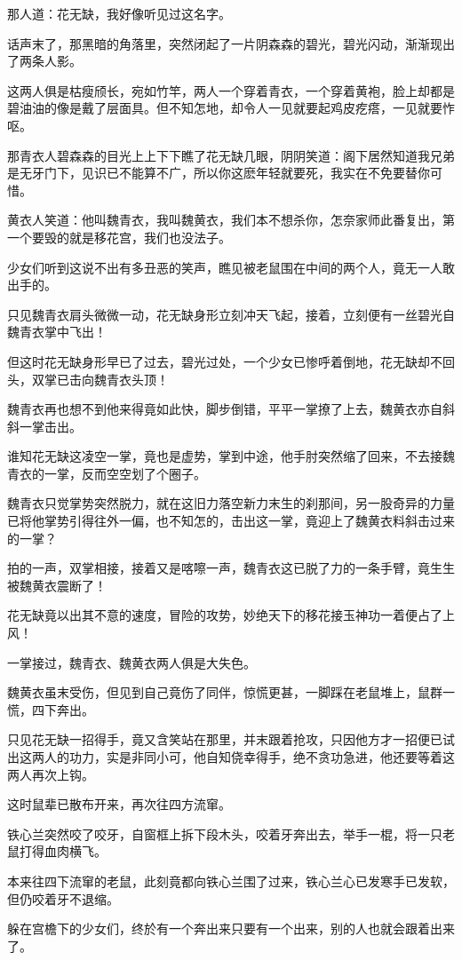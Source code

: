 \documentclass[12pt,oneside]{book}
\begin{document}
那人道：花无缺，我好像听见过这名字。

话声末了，那黑暗的角落里，突然闭起了一片阴森森的碧光，碧光闪动，渐渐现出了两条人影。

这两人俱是枯瘦颀长，宛如竹竿，两人一个穿着青衣，一个穿着黄袍，脸上却都是碧油油的像是戴了层面具。但不知怎地，却令人一见就要起鸡皮疙瘩，一见就要怍呕。

那青衣人碧森森的目光上上下下瞧了花无缺几眼，阴阴笑道：阁下居然知道我兄弟是无牙门下，见识已不能算不广，所以你这麽年轻就要死，我实在不免要替你可惜。

黄衣人笑道：他叫魏青衣，我叫魏黄衣，我们本不想杀你，怎奈家师此番复出，第一个要毁的就是移花宫，我们也没法子。

少女们听到这说不出有多丑恶的笑声，瞧见被老鼠围在中间的两个人，竟无一人敢出手的。

只见魏青衣肩头微微一动，花无缺身形立刻冲天飞起，接着，立刻便有一丝碧光自魏青衣掌中飞出！

但这时花无缺身形早已了过去，碧光过处，一个少女已惨呼着倒地，花无缺却不回头，双掌已击向魏青衣头顶！

魏青衣再也想不到他来得竟如此快，脚步倒错，平平一掌撩了上去，魏黄衣亦自斜斜一掌击出。

谁知花无缺这凌空一掌，竟也是虚势，掌到中途，他手肘突然缩了回来，不去接魏青衣的一掌，反而空空划了个圈子。

魏青衣只觉掌势突然脱力，就在这旧力落空新力末生的刹那间，另一股奇异的力量已将他掌势引得往外一偏，也不知怎的，击出这一掌，竟迎上了魏黄衣料斜击过来的一掌？

拍的一声，双掌相接，接着又是喀嚓一声，魏青衣这已脱了力的一条手臂，竟生生被魏黄衣震断了！

花无缺竟以出其不意的速度，冒险的攻势，妙绝天下的移花接玉神功一着便占了上风！

一掌接过，魏青衣、魏黄衣两人俱是大失色。

魏黄衣虽末受伤，但见到自己竟伤了同伴，惊慌更甚，一脚踩在老鼠堆上，鼠群一慌，四下奔出。

只见花无缺一招得手，竟又含笑站在那里，并末跟着抢攻，只因他方才一招便已试出这两人的功力，实是非同小可，他自知侥幸得手，绝不贪功急进，他还要等着这两人再次上钩。

这时鼠辈已散布开来，再次往四方流窜。

铁心兰突然咬了咬牙，自窗框上拆下段木头，咬着牙奔出去，举手一棍，将一只老鼠打得血肉横飞。

本来往四下流窜的老鼠，此刻竟都向铁心兰围了过来，铁心兰心已发寒手已发软，但仍咬着牙不退缩。

躲在宫檐下的少女们，终於有一个奔出来只要有一个出来，别的人也就会跟着出来了。
\end{document}
